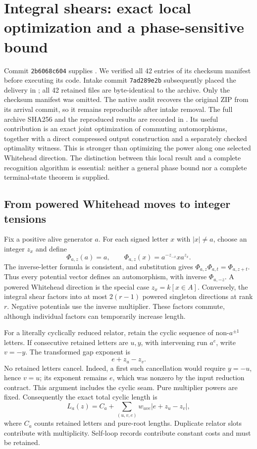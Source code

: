 \section{Integral shears: exact local optimization and a phase-sensitive bound}
\label{sec:integral-shears-review}

Commit \texttt{2b6068c604} supplies
.
We verified all 42 entries of its checksum manifest before executing its
code. Intake commit \texttt{7ad289e2b} subsequently placed the delivery in
; all 42 retained files are byte-identical to the archive.
Only the checksum manifest was omitted. The native audit recovers the original
ZIP from its arrival commit, so it remains reproducible after intake removal. The full archive SHA256 and the reproduced results are recorded in
. Its useful contribution is an exact
joint optimization of commuting automorphisms, together with a direct
compressed output construction and a separately checked optimality witness.
This is stronger than optimizing the power along one selected Whitehead
direction. The distinction between this local result and a complete
recognition algorithm is essential: neither a general phase bound nor a
complete terminal-state theorem is supplied.

\subsection{From powered Whitehead moves to integer tensions}

Fix a positive alive generator $a$. For each signed letter $x$ with
$|x|\ne a$, choose an integer $z_x$ and define
\[
 \Phi_{a,z}(a)=a,\qquad
 \Phi_{a,z}(x)=a^{-z_{-x}}x a^{z_x}.
\]
The inverse-letter formula is consistent, and substitution gives
$\Phi_{a,z}\Phi_{a,t}=\Phi_{a,z+t}$. Thus every potential vector defines
an automorphism, with inverse $\Phi_{a,-z}$. A powered Whitehead direction
is the special case $z_x=k[x\in A]$. Conversely, the integral shear factors
into at most $2(r-1)$ powered singleton directions at rank $r$. Negative
potentials use the inverse multiplier. These factors commute, although
individual factors can temporarily increase length.

For a literally cyclically reduced relator, retain the cyclic sequence of
non-$a^{\pm1}$ letters. If consecutive retained letters are $u,y$, with
intervening run $a^e$, write $v=-y$. The transformed gap exponent is
\[
 e+z_u-z_v.
\]
No retained letters cancel. Indeed, a first such cancellation would require
$y=-u$, hence $v=u$; its exponent remains $e$, which was nonzero by the
input reduction contract. This argument includes the cyclic seam. Pure
multiplier powers are fixed. Consequently the exact total cyclic length is
\begin{equation}
 L_a(z)=C_a+\sum_{(u,v,e)}w_{uve}|e+z_u-z_v|,
 \label{eq:shear-review-objective}
\end{equation}
where $C_a$ counts retained letters and pure-root lengths. Duplicate relator
slots contribute with multiplicity. Self-loop records contribute constant
costs and must be retained.

